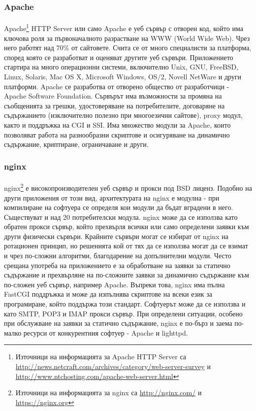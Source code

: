 \documentclass[pdftex,14pt,a4paper]{extreport}
\begin{document}
\subsubsection {Apache}
\paragraph {}
Apache\footnote{Източници на информацията за Apache HTTP Server са \url{http://news.netcraft.com/archives/category/web-server-survey} и \url{http://www.ntchosting.com/apache-web-server.html}} HTTP Server или само Apache е уеб сървър с отворен код, който има ключова роля за първоначалното разрастване на WWW (World Wide Web). Чрез него работят над 70\% от сайтовете. Счита се от много специалисти за платформа, според която се разработват и оценяват другите уеб сървъри.
Приложението стартира на много операционни системи, включително Unix, GNU, FreeBSD, Linux, Solaris, Mac OS X, Microsoft Windows, OS/2, Novell NetWare и други платформи.
Apache се разработва от отворено общество от разработчици - Apache Software Foundation. Сървърът има възможности за промяна на съобщенията за грешки, удостоверяване на потребителите, договаряне на съдържанието (изключително полезно при многоезични сайтове), proxy модул, както и поддръжка на CGI и SSI. Има множество модули за Apache, които позволяват работа на разнообразни скриптове и осигуряване на динамично съдържание, криптиране, ограничаване и други.
\subsubsection {nginx}
\paragraph {}
nginx\footnote{Източници на информацията за nginx са \url{http://nginx.com/} и \url{https://nginx.org}} е високопроизводителен уеб сървър и прокси под BSD лиценз. Подобно на други приложения от този вид, архитектурата на nginx е модулна - при компилиране на софтуера се определя кои модули да бъдат вградени в него. Съществуват и над 20 потребителски модула.
nginx може да се използва като обратен прокси сървър, който прехвърля всички или само определени заявки към други физически сървъри. Крайните сървъри могат се избират от nginx на ротационен принцип, но решенията кой от тях да се използва могат да се взимат и чрез по-сложни алгоритми, благодарение на допълнителни модули. Често срещана употреба на приложението е за обработване на заявки за статично съдържание и прехвърляне на по-сложните заявки за динамично съдържание към по-сложен уеб сървър, например Apache. Въпреки това, nginx има пълна FastCGI поддръжка и може да изпълнява скриптове на всеки език за програмиране, който поддържа този стандарт. Софтуерът може да се използва и като SMTP, POP3 и IMAP прокси сървър.
При определени ситуации, особено при обслужване на заявки за статично съдържание, nginx е по-бърз и заема по-малко ресурси от конкурентния софтуер - Apache и lighttpd.
\end{document}
